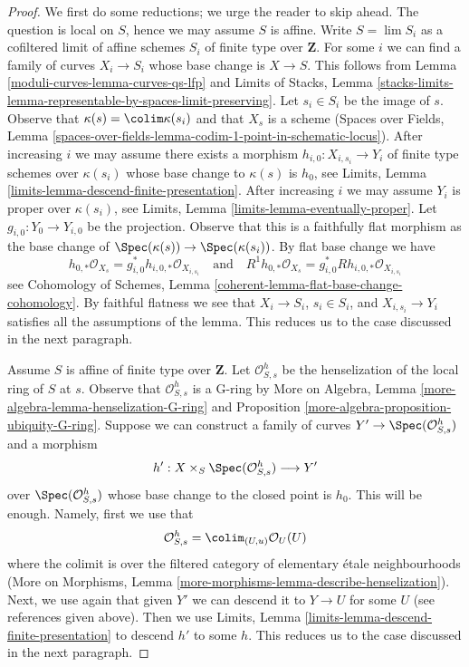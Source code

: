 \begin{proof}
We first do some reductions; we urge the reader to skip ahead.
The question is local on $S$, hence we may assume $S$ is affine.
Write $S = \lim S_i$ as a cofiltered limit of affine schemes $S_i$
of finite type over $\mathbf{Z}$.
For some $i$ we can find a family of curves $X_i \to S_i$
whose base change is $X \to S$. This follows from
Lemma \ref{moduli-curves-lemma-curves-qs-lfp} and
Limits of Stacks, Lemma
\ref{stacks-limits-lemma-representable-by-spaces-limit-preserving}.
Let $s_i \in S_i$ be the image of $s$. Observe that
$\kappa(s) = \colim \kappa(s_i)$ and that $X_s$ is a scheme
(Spaces over Fields, Lemma
\ref{spaces-over-fields-lemma-codim-1-point-in-schematic-locus}).
After increasing $i$ we may assume there exists a morphism
$h_{i, 0} : X_{i, s_i} \to Y_i$
of finite type schemes over $\kappa(s_i)$ whose base change to
$\kappa(s)$ is $h_0$, see
Limits, Lemma \ref{limits-lemma-descend-finite-presentation}.
After increasing $i$ we may assume $Y_i$ is proper over $\kappa(s_i)$, see
Limits, Lemma \ref{limits-lemma-eventually-proper}.
Let $g_{i, 0} : Y_0 \to Y_{i, 0}$ be the projection. Observe that
this is a faithfully flat morphism as the base change of
$\Spec(\kappa(s)) \to \Spec(\kappa(s_i))$.
By flat base change we have
$$
h_{0, *}\mathcal{O}_{X_s} = g_{i, 0}^*h_{i, 0, *}\mathcal{O}_{X_{i, s_i}}
\quad\text{and}\quad
R^1h_{0, *}\mathcal{O}_{X_s} = g_{i, 0}^*Rh_{i, 0, *}\mathcal{O}_{X_{i, s_i}}
$$
see Cohomology of Schemes, Lemma
\ref{coherent-lemma-flat-base-change-cohomology}.
By faithful flatness we see that $X_i \to S_i$, $s_i \in S_i$, and
$X_{i, s_i} \to Y_i$ satisfies all the assumptions of the lemma.
This reduces us to the case discussed in the next paragraph.

\medskip\noindent
Assume $S$ is affine of finite type over $\mathbf{Z}$.
Let $\mathcal{O}_{S, s}^h$ be the henselization of the local
ring of $S$ at $s$. Observe that $\mathcal{O}_{S, s}^h$ is a G-ring by
More on Algebra, Lemma \ref{more-algebra-lemma-henselization-G-ring} and
Proposition \ref{more-algebra-proposition-ubiquity-G-ring}.
Suppose we can construct a family of curves
$Y' \to \Spec(\mathcal{O}_{S, s}^h)$ and a morphism
$$
h' : X \times_S \Spec(\mathcal{O}_{S, s}^h) \longrightarrow Y'
$$
over $\Spec(\mathcal{O}_{S, s}^h)$ whose base change to the closed
point is $h_0$. This will be enough. Namely, first we use that
$$
\mathcal{O}_{S, s}^h = \colim_{(U, u)} \mathcal{O}_U(U)
$$
where the colimit is over the filtered category of
elementary \'etale neighbourhoods (More on Morphisms, Lemma
\ref{more-morphisms-lemma-describe-henselization}).
Next, we use again that given $Y'$ we can descend it to
$Y \to U$ for some $U$ (see references given above).
Then we use
Limits, Lemma \ref{limits-lemma-descend-finite-presentation}
to descend $h'$ to some $h$. This reduces us to the case
discussed in the next paragraph.


\end{proof}
